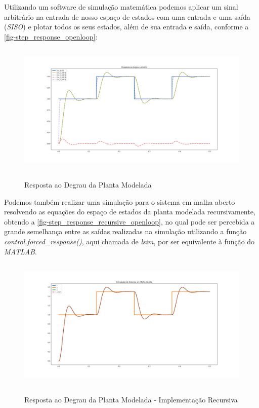 \documentclass[
	12pt,				%
	article,			%
	openright,			%
	oneside,
	a4paper,			%
	chapter=TITLE,		%
	section=TITLE,		%
	english,			%
	french,				%
	spanish,			%
	brazil,				%
]{abntex2}
\begin{document}
        Utilizando um software de simulação matemática podemos aplicar um sinal arbitrário na entrada de nosso espaço de estados com uma entrada e uma saída (\textit{SISO}) e plotar todos os seus estados, além de sua entrada e saída, conforme a \autoref{fig-step_response_openloop}:
        
        \begin{figure}[htbp]
        	\centering
        	\caption{Resposta ao Degrau da Planta Modelada}
        	\includegraphics[width=\textwidth,height=240px,keepaspectratio]{imgs/step_response_openloop.png}
        	\label{fig-step_response_openloop}
    	\end{figure}
    	
    	Podemos também realizar uma simulação para o sistema em malha aberto resolvendo as equações do espaço de estados da planta modelada recursivamente, obtendo a \autoref{fig-step_response_recursive_openloop}, no qual pode ser percebida a grande semelhança entre as saídas realizadas na simulação utilizando a função \textit{control.forced\_response()}, aqui chamada de \textit{lsim}, por ser equivalente à função do \textit{MATLAB}.
    	
    	\begin{figure}[htbp]
        	\centering
        	\caption{Resposta ao Degrau da Planta Modelada - Implementação Recursiva}
        	\includegraphics[width=\textwidth,height=240px,keepaspectratio]{imgs/step_response_recursive_openloop.png}
        	\label{fig-step_response_recursive_openloop}
    	\end{figure}
    	
\end{document}
